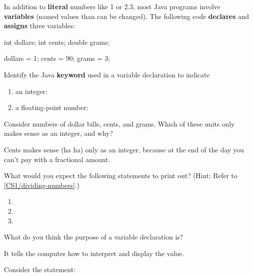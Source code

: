 
\label{CS1/variable-declare}

In addition to \textbf{literal} numbers like 1 or 2.3, most Java programs involve \textbf{variables} (named values than can be changed).
The following code \textbf{declares} and \textbf{assigns} three variables:

\begin{javabox}
int dollars;
int cents;
double grams;

dollars = 1;
cents = 90;
grams = 3;
\end{javabox}



\Q Identify the Java \textbf{keyword} used in a variable declaration to indicate

\begin{enumerate}
\item an integer: 
\item a floating-point number: 
\end{enumerate}


\Q Consider numbers of dollar bills, cents, and grams. Which of these units only makes sense as an integer, and why?

\begin{answer}
Cents makes sense (ha ha) only as an integer, because at the end of the day you can't pay with a fractional amount.
\end{answer}


\Q What would you expect the following statements to print out? (Hint: Refer to \ref{CS1/dividing-numbers}.)

\begin{enumerate}
\item {} 
\item {} 
\item {} 
\end{enumerate}


\Q What do you think the purpose of a variable declaration is?

\begin{answer}
It tells the computer how to interpret and display the value.
\end{answer}


\Q Consider the statement: ~ 

